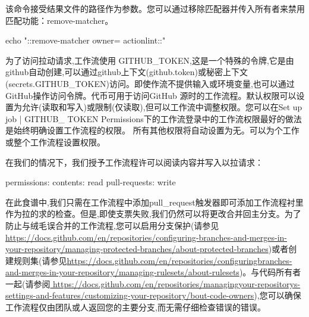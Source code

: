 该命令接受结果文件的路径作为参数。您可以通过移除匹配器并传入所有者来禁用匹配功能：remove-matcher。

\begin{shell}
  echo "::remove-matcher owner= actionlint::"
\end{shell}

为了访问拉动请求,工作流使用 GITHUB\_TOKEN,这是一个特殊的令牌,它是由github自动创建,可以通过github上下文(github.token)或秘密上下文(secrets.GITHUB\_TOKEN)访问。即使作流不提供输入或环境变量,也可以通过GitHub操作访问令牌。代币可用于访问GitHub 源时的工作流程。默认权限可以设置为允许(读取和写入)或限制(仅读取),但可以工作流中调整权限。您可以在Set up job | GITHUB\_
TOKEN Permissions下的工作流登录中的工作流权限最好的做法是始终明确设置工作流程的权限。 所有其他权限将自动设置为无。可以为个工作或整个工作流程设置权限。

在我们的情况下，我们授予工作流程许可以阅读内容并写入以拉请求：

\begin{shell}
permissions:
  contents: read
  pull-requests: write
\end{shell}


在此食谱中,我们只需在工作流程中添加pull\_request触发器即可添加工作流程衬里作为拉的求的检查。但是,即使支票失败,我们仍然可以将更改合并回主分支。为了防止与绒毛误合并的工作流程,您可以启用分支保护(请参见\url{https://docs.github.com/en/repositories/configuring-branches-and-merges-in-your-repository/managing-protected-branches/about-protected-branches})或者创建规则集(请参见\url{https://docs.github.com/en/repositories/configuringbranches-and-merges-in-your-repository/managing-rulesets/about-rulesets})。与代码所有者一起(请参阅\url{ https://docs.github.com/en/repositories/managingyour-repositorys-settings-and-features/customizing-your-repository/bout-code-owners}),您可以确保工作流程仅由团队或人返回您的主要分支,而无需仔细检查错误的错误。












